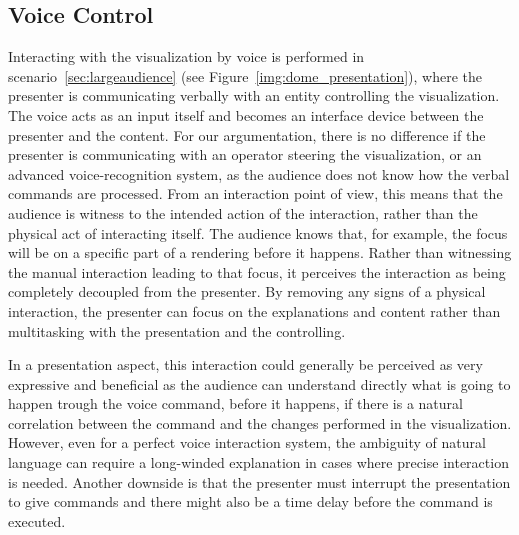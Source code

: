\documentclass[review,journal]{vgtc}         %
\begin{document}
\subsection{Voice Control}

Interacting with the visualization by voice is performed in scenario~\ref{sec:largeaudience} (see Figure~\ref{img:dome_presentation}), where the presenter is communicating verbally with an entity controlling the visualization.
The voice acts as an input itself and becomes an interface device between the presenter and the content.
For our argumentation, there is no difference if the presenter is communicating with an operator steering the visualization, or an advanced voice-recognition system, as the audience does not know how the verbal commands are processed.
%
From an interaction point of view, this means that the audience is witness to the intended action of the interaction, rather than the physical act of interacting itself.
The audience knows that, for example, the focus will be on a specific part of a rendering before it happens.
Rather than witnessing the manual interaction leading to that focus, it perceives the interaction as being completely decoupled from the presenter.
By removing any signs of a physical interaction, the presenter can focus on the explanations and content rather than multitasking with the presentation and the controlling.

In a presentation aspect, this interaction could generally be perceived as very expressive and beneficial as the audience can understand directly what is going to happen trough the voice command, before it happens, if there is a natural correlation between the command and the changes performed in the visualization.
However, even for a perfect voice interaction system, the ambiguity of natural language can require a long-winded explanation in cases where precise interaction is needed. Another downside is that the presenter must interrupt the presentation to give commands and there might also be a time delay before the command is executed.
\end{document}
